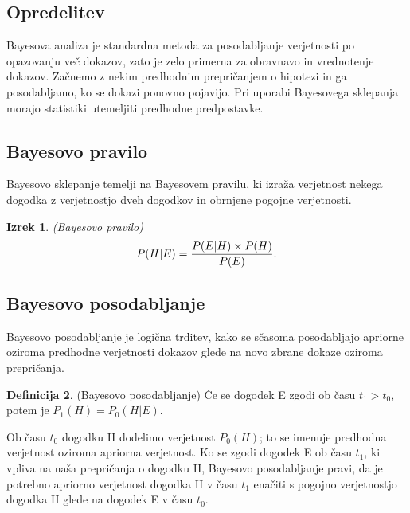 \documentclass[12pt,a4paper]{amsart}
\theoremstyle{definition} %
\newtheorem{definicija}{Definicija}[section]
\theoremstyle{plain} %
\newtheorem{izrek}[definicija]{Izrek}
\begin{document}
\subsection{Opredelitev}
Bayesova analiza je standardna metoda za posodabljanje verjetnosti po opazovanju več dokazov, zato je zelo primerna za obravnavo in vrednotenje 
dokazov.
Začnemo z nekim predhodnim prepričanjem o hipotezi in ga posodabljamo, ko se dokazi ponovno pojavijo. Pri uporabi Bayesovega sklepanja morajo 
statistiki utemeljiti predhodne predpostavke.

\subsection{Bayesovo pravilo}
Bayesovo sklepanje temelji na Bayesovem pravilu, ki izraža verjetnost nekega dogodka z verjetnostjo dveh dogodkov in obrnjene pogojne
verjetnosti.
\begin{izrek}
    (Bayesovo pravilo)
    \begin{equation}\label{eq:bpravilo}
        P(H \lvert E) = \frac{P(E \lvert H) \times P(H)}{P(E)}. \vspace{2mm}
     \end{equation}
\end{izrek}

\subsection{Bayesovo posodabljanje}
Bayesovo posodabljanje je logična trditev, kako se sčasoma posodabljajo
apriorne oziroma predhodne verjetnosti dokazov glede na novo zbrane dokaze oziroma prepričanja.
\begin{definicija}
    (Bayesovo posodabljanje)
    Če se dogodek E zgodi ob času $t_1 > t_0$, potem je $P_1(H) = P_0(H \lvert E)$.
\end{definicija}
Ob času $t_0$ dogodku H dodelimo verjetnost $P_0(H)$; to se imenuje predhodna verjetnost oziroma apriorna verjetnost. Ko se zgodi dogodek E
ob času $t_1$, ki vpliva na naša prepričanja o dogodku H, Bayesovo posodabljanje pravi, da je potrebno apriorno verjetnost dogodka H v času $t_1$
enačiti s pogojno verjetnostjo dogodka H glede na dogodek E v času $t_0$. \\
\end{document}
